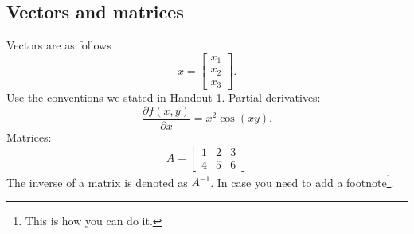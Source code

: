 \documentclass[a4paper,11pt,reqno]{amsart}
\begin{document}
\subsection{Vectors and matrices}
Vectors are as follows
\begin{equation}
    x =
    \begin{bmatrix}
        x_1
        \\
        x_2
        \\
        x_3
    \end{bmatrix}.
\end{equation}
Use the conventions we stated in Handout 1.
Partial derivatives:
\begin{equation}
    \label{eq:partial_derivatives}
    \frac{\partial f(x, y)}{\partial x} = x^2\cos(xy).
\end{equation}
Matrices:
\begin{equation}
    A =
    \begin{bmatrix}
        1 & 2 & 3
        \\
        4 & 5 & 6
    \end{bmatrix}
\end{equation}
The inverse of a matrix is denoted as $A^{-1}$. In case you need to add a footnote\footnote{This is how you can do it.}.
\end{document}
